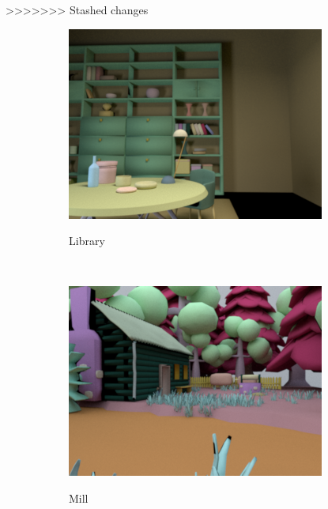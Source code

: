 \documentclass{jov}
\begin{document}
>>>>>>> Stashed changes
\begin{figure}[t]
\centering
\begin{subfigure}[b]{0.22 \textwidth}
        \caption{Library }
        \includegraphics[width=\textwidth]{../FiguresDraft4/Figure3/Figure3_a.png}
        \label{fig:baseSceneLibrary}
    \end{subfigure}
    ~
    \begin{subfigure}[b]{0.22 \textwidth}
        \caption{Mill}    
        \includegraphics[width=\textwidth]{../FiguresDraft4/Figure3/Figure3_b.png}
        \label{fig:baseSceneMill}
    \end{subfigure}    
    ~
    \begin{subfigure}[b]{0.22 \textwidth}

\end{subfigure}
\end{figure}
\end{document}

